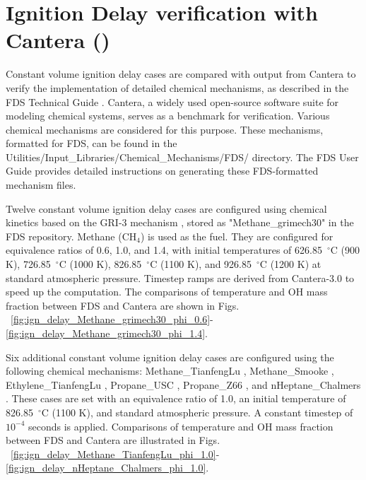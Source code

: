 \documentclass[11pt]{book}
\begin{document}
\section{Ignition Delay verification with Cantera ()}
\label{ignition_delay}

Constant volume ignition delay cases are compared with output from Cantera \cite{cantera:2023} to verify the implementation of detailed chemical mechanisms, as described in the FDS Technical Guide \cite{FDS_Math_Guide}. Cantera, a widely used open-source software suite for modeling chemical systems, serves as a benchmark for verification. Various chemical mechanisms are considered for this purpose. These mechanisms, formatted for FDS, can be found in the {\ct Utilities/Input\_Libraries/Chemical\_Mechanisms/FDS/} directory. The FDS User Guide \cite{FDS_Users_Guide} provides detailed instructions on generating these FDS-formatted mechanism files.

Twelve constant volume ignition delay cases are configured using chemical kinetics based on the GRI-3 mechanism \cite{gri3:1999}, stored as "Methane\_grimech30" in the FDS repository. Methane ($\mathrm{CH_4}$) is used as the fuel. They are configured for equivalence ratios of 0.6, 1.0, and 1.4, with initial temperatures of 626.85~$^\circ$C (900 K), 726.85~$^\circ$C (1000 K), 826.85~$^\circ$C (1100 K), and 926.85~$^\circ$C (1200 K) at standard atmospheric pressure. Timestep ramps are derived from Cantera-3.0 to speed up the computation. The comparisons of temperature and OH mass fraction between FDS and Cantera are shown in Figs. ~\ref{fig:ign_delay_Methane_grimech30_phi_0.6}-\ref{fig:ign_delay_Methane_grimech30_phi_1.4}.

Six additional constant volume ignition delay cases are configured using the following chemical mechanisms: Methane\_TianfengLu \cite{TianfengLu:2008}, Methane\_Smooke \cite{Smooke:1995}, Ethylene\_TianfengLu \cite{Luo:2012}, Propane\_USC \cite{Qin:20001}, Propane\_Z66 \cite{Zettervall2017}, and nHeptane\_Chalmers \cite{Tao:2007}. These cases are set with an equivalence ratio of 1.0, an initial temperature of 826.85~$^\circ$C (1100 K), and standard atmospheric pressure. A constant timestep of $10^{-4}$ seconds is applied. Comparisons of temperature and OH mass fraction between FDS and Cantera are illustrated in Figs. ~\ref{fig:ign_delay_Methane_TianfengLu_phi_1.0}-\ref{fig:ign_delay_nHeptane_Chalmers_phi_1.0}.
\end{document}
